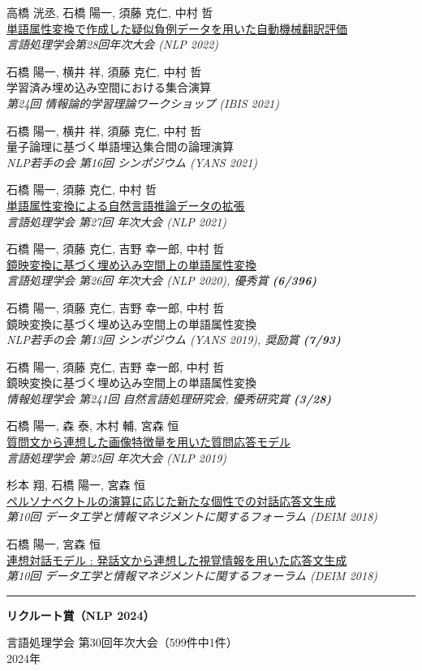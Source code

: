 \documentclass[11pt,a4paper]{article}
\let\oldhref\href
\renewcommand{\href}[2]{\oldhref{#1}{\uline{#2}}}
\newlength{\labelcol}\setlength{\labelcol}{1.2in}
\newlength{\labelgap}\setlength{\labelgap}{0.21in}
\newcommand{\cvsection}[1]{%
  \par\vspace{26pt}%
  {\noindent\rule{\textwidth}{2.4pt}\par}\nopagebreak\vspace{9pt}%
  \noindent\llap{\smash[b]{\parbox[t]{\labelcol}{\raggedright\large\bfseries #1}}\hspace{\labelgap}}\ignorespaces}
\newcommand{\entryfirst}[1]{\textbf{#1}\par\nopagebreak}
\newcommand{\awardline}[1]{{\par\raggedleft #1\par}}
\newcommand{\paper}[3]{\par\vspace{12pt}\noindent #1\\ #2\\ {\itshape #3}\par}
\begin{document}
\paper{高橋 洸丞, 石橋 陽一, 須藤 克仁, 中村 哲}
{\href{https://www.anlp.jp/proceedings/annual_meeting/2022/pdf_dir/G3-2.pdf}{単語属性変換で作成した疑似負例データを用いた自動機械翻訳評価}}
{\upshape 言語処理学会第28回年次大会 (NLP 2022)}

\paper{石橋 陽一, 横井 祥, 須藤 克仁, 中村 哲}
{学習済み埋め込み空間における集合演算}
{\upshape 第24回 情報論的学習理論ワークショップ (IBIS 2021)}

\paper{石橋 陽一, 横井 祥, 須藤 克仁, 中村 哲}
{量子論理に基づく単語埋込集合間の論理演算}
{\upshape NLP若手の会 第16回 シンポジウム (YANS 2021)}

\paper{石橋 陽一, 須藤 克仁, 中村 哲}
{\href{https://www.anlp.jp/proceedings/annual_meeting/2021/pdf_dir/P4-13.pdf}{単語属性変換による自然言語推論データの拡張}}
{\upshape 言語処理学会 第27回 年次大会 (NLP 2021)}

\paper{石橋 陽一, 須藤 克仁, 吉野 幸一郎, 中村 哲}
{\href{https://www.anlp.jp/proceedings/annual_meeting/2020/pdf_dir/P6-2.pdf}{鏡映変換に基づく埋め込み空間上の単語属性変換}}
{\upshape 言語処理学会 第26回 年次大会 (NLP 2020), 優秀賞 \textbf{(6/396)}}

\paper{石橋 陽一, 須藤 克仁, 吉野 幸一郎, 中村 哲}
{鏡映変換に基づく埋め込み空間上の単語属性変換}
{\upshape NLP若手の会 第13回 シンポジウム (YANS 2019), 奨励賞 \textbf{(7/93)}}

\paper{石橋 陽一, 須藤 克仁, 吉野 幸一郎, 中村 哲}
{鏡映変換に基づく埋め込み空間上の単語属性変換}
{\upshape 情報処理学会 第241回 自然言語処理研究会, 優秀研究賞 \textbf{(3/28)}}

\paper{石橋 陽一, 森 泰, 木村 輔, 宮森 恒}
{\href{https://www.anlp.jp/proceedings/annual_meeting/2019/pdf_dir/D3-4.pdf}{質問文から連想した画像特徴量を用いた質問応答モデル}}
{\upshape 言語処理学会 第25回 年次大会 (NLP 2019)}

\paper{杉本 翔, 石橋 陽一, 宮森 恒}
{\href{https://db-event.jpn.org/deim2018/data/papers/347.pdf}{ペルソナベクトルの演算に応じた新たな個性での対話応答文生成}}
{\upshape 第10回 データ工学と情報マネジメントに関するフォーラム (DEIM 2018)}

\paper{石橋 陽一, 宮森 恒}
{\href{https://db-event.jpn.org/deim2018/data/papers/159.pdf}{連想対話モデル : 発話文から連想した視覚情報を用いた応答文生成}}
{\upshape 第10回 データ工学と情報マネジメントに関するフォーラム (DEIM 2018)}

\cvsection{受賞・\\研究助成}%
\entryfirst{リクルート賞（NLP 2024）}
\awardline{言語処理学会 第30回年次大会（599件中1件）\\ 2024年}
\end{document}
